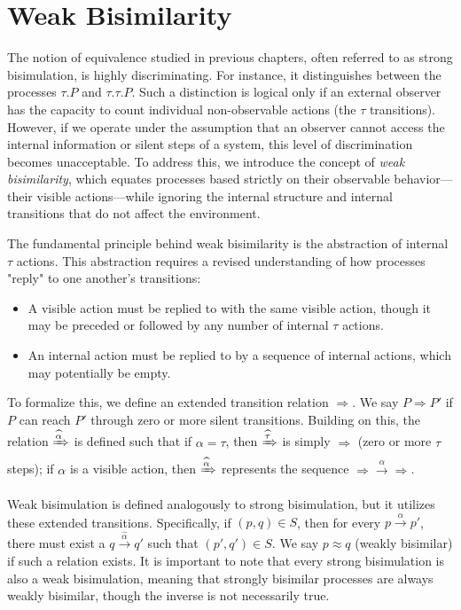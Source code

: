 \chapter{Weak Bisimilarity}
The notion of equivalence studied in previous chapters, often referred to as strong bisimulation, is highly discriminating. For instance, it distinguishes between the processes $\tau.P$ and $\tau.\tau.P$. Such a distinction is logical only if an external observer has the capacity to count individual non-observable actions (the $\tau$ transitions). However, if we operate under the assumption that an observer cannot access the internal information or silent steps of a system, this level of discrimination becomes unacceptable. To address this, we introduce the concept of \textit{weak bisimilarity}, which equates processes based strictly on their observable behavior—their visible actions—while ignoring the internal structure and internal transitions that do not affect the environment.

The fundamental principle behind weak bisimilarity is the abstraction of internal $\tau$ actions. This abstraction requires a revised understanding of how processes "reply" to one another's transitions:
\begin{itemize}
    \item A visible action must be replied to with the same visible action, though it may be preceded or followed by any number of internal $\tau$ actions.
    \item An internal action must be replied to by a sequence of internal actions, which may potentially be empty.
\end{itemize}

To formalize this, we define an extended transition relation $\Rightarrow$. We say $P\Rightarrow P'$ if $P$ can reach $P'$ through zero or more silent transitions. Building on this, the relation $\xRightarrow{\widehat{\alpha}}$ is defined such that if $\alpha=\tau$, then $\xRightarrow{\widehat{\tau}}$ is simply $\Rightarrow$ (zero or more $\tau$ steps); if $\alpha$ is a visible action, then $\xRightarrow{\widehat{\alpha}}$ represents the sequence $\Rightarrow\xrightarrow{\alpha}\Rightarrow$.

Weak bisimulation is defined analogously to strong bisimulation, but it utilizes these extended transitions. Specifically, if $(p,q)\in S$, then for every $p\xrightarrow{\alpha}p'$, there must exist a $q\xrightarrow{\widehat{\alpha}}q'$ such that $(p',q')\in S$. We say $p\approx q$ (weakly bisimilar) if such a relation exists. It is important to note that every strong bisimulation is also a weak bisimulation, meaning that strongly bisimilar processes are always weakly bisimilar, though the inverse is not necessarily true.

